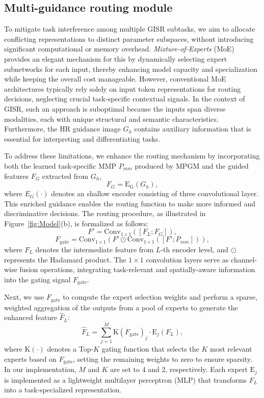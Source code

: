 \documentclass[lettersize,journal]{IEEEtran}
\begin{document}
\subsection{Multi-guidance routing module}
To mitigate task interference among multiple GISR subtasks, we aim to allocate conflicting representations to distinct parameter subspaces, without introducing significant computational or memory overhead. \textit{Mixture-of-Experts} (MoE)~\cite{moe_original} provides an elegant mechanism for this by dynamically selecting expert subnetworks for each input, thereby enhancing model capacity and specialization while keeping the overall cost manageable.
However, conventional MoE architectures typically rely solely on input token representations for routing decisions, neglecting crucial task-specific contextual signals. In the context of GISR, such an approach is suboptimal because the inputs span diverse modalities, each with unique structural and semantic characteristics. Furthermore, the HR guidance image $G_h$ contains auxiliary information that is essential for interpreting and differentiating tasks.

To address these limitations, we enhance the routing mechanism by incorporating both the learned task-specific MMP $P_{mm}$ produced by MPGM and the guided features $F_G$ extracted from $G_h$,
\begin{equation}
    F_G = \mathrm{E_G}(G_h), 
\end{equation}
where $E_G(\cdot)$ denotes an shallow encoder consisting of three convolutional layer.
This enriched guidance enables the routing function to make more informed and discriminative decisions. The routing procedure, as illustrated in Figure~\ref{fig:Model}(b), is formalized as follows:
\begin{equation}
    F' = \mathrm{Conv}_{1\times 1}([F_L ; F_G]),
\end{equation}
\begin{equation}
    F_{\text{gate}} = \mathrm{Conv}_{1\times 1}(F' \odot \mathrm{Conv}_{1\times 1}([F' ; P_{mm}])),
\end{equation}
where $F_L$ denotes the intermediate feature from $L$-th encoder level, and $\odot$ represents the Hadamard product. The $1 \times 1$ convolution layers serve as channel-wise fusion operations, integrating task-relevant and spatially-aware information into the gating signal $F_{\text{gate}}$.

Next, we use $F_{\text{gate}}$ to compute the expert selection weights and perform a sparse, weighted aggregation of the outputs from a pool of experts to generate the enhanced feature $\hat{F}_L$:
\begin{equation}
    \hat{F}_L = \sum_{j=1}^{M} \mathrm{K}(F_{\text{gate}})_j \cdot \mathrm{E}_j(F_L),
\end{equation}
where $\mathrm{K}(\cdot)$ denotes a Top-$K$ gating function that selects the $K$ most relevant experts based on $F_{\text{gate}}$, setting the remaining weights to zero to ensure sparsity. In our implementation, $M$ and $K$ are set to 4 and 2, respectively. Each expert $\mathrm{E}_j$ is implemented as a lightweight multilayer perceptron (MLP) that transforms $F_L$ into a task-specialized representation.
\end{document}
